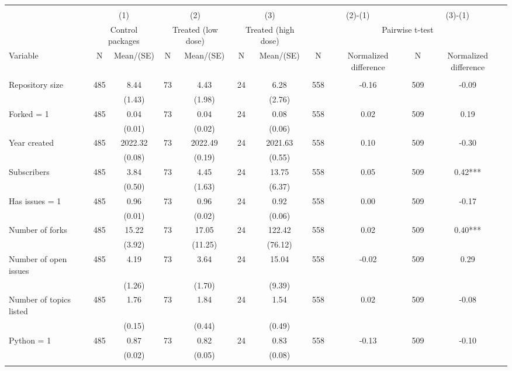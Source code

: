 \begin{tabular}{@{\extracolsep{5pt}}lcccccccccc}
\\[-1.8ex]\hline \hline \\[-1.8ex]
 & \multicolumn{2}{c}{(1)}  & \multicolumn{2}{c}{(2)}  & \multicolumn{2}{c}{(3)}  & \multicolumn{2}{c}{(2)-(1)} & \multicolumn{2}{c}{(3)-(1)} \\
 & \multicolumn{2}{c}{Control packages}  & \multicolumn{2}{c}{Treated (low dose)}  & \multicolumn{2}{c}{Treated (high dose)}  & \multicolumn{4}{c}{Pairwise t-test}  \\
Variable & N & Mean/(SE) & N & Mean/(SE) & N & Mean/(SE) & N & Normalized difference & N & Normalized difference \\ \hline \\[-1.8ex] 
Repository size   & 485    & 8.44    & 73    & 4.43    & 24    & 6.28    & 558    & -0.16    & 509    & -0.09   \\
 &   & (1.43)  &   & (1.98)  &   & (2.76)  &   &  &   &  \\ [1ex]
Forked = 1   & 485    & 0.04    & 73    & 0.04    & 24    & 0.08    & 558    & 0.02    & 509    & 0.19   \\
 &   & (0.01)  &   & (0.02)  &   & (0.06)  &   &  &   &  \\ [1ex]
Year created   & 485    & 2022.32    & 73    & 2022.49    & 24    & 2021.63    & 558    & 0.10    & 509    & -0.30   \\
 &   & (0.08)  &   & (0.19)  &   & (0.55)  &   &  &   &  \\ [1ex]
Subscribers   & 485    & 3.84    & 73    & 4.45    & 24    & 13.75    & 558    & 0.05    & 509    & 0.42***   \\
 &   & (0.50)  &   & (1.63)  &   & (6.37)  &   &  &   &  \\ [1ex]
Has issues = 1   & 485    & 0.96    & 73    & 0.96    & 24    & 0.92    & 558    & 0.00    & 509    & -0.17   \\
 &   & (0.01)  &   & (0.02)  &   & (0.06)  &   &  &   &  \\ [1ex]
Number of forks   & 485    & 15.22    & 73    & 17.05    & 24    & 122.42    & 558    & 0.02    & 509    & 0.40***   \\
 &   & (3.92)  &   & (11.25)  &   & (76.12)  &   &  &   &  \\ [1ex]
Number of open issues   & 485    & 4.19    & 73    & 3.64    & 24    & 15.04    & 558    & -0.02    & 509    & 0.29   \\
 &   & (1.26)  &   & (1.70)  &   & (9.39)  &   &  &   &  \\ [1ex]
Number of topics listed   & 485    & 1.76    & 73    & 1.84    & 24    & 1.54    & 558    & 0.02    & 509    & -0.08   \\
 &   & (0.15)  &   & (0.44)  &   & (0.49)  &   &  &   &  \\ [1ex]
Python = 1   & 485    & 0.87    & 73    & 0.82    & 24    & 0.83    & 558    & -0.13    & 509    & -0.10   \\
 &   & (0.02)  &   & (0.05)  &   & (0.08)  &   &  &   &  \\ [1ex]
\hline \hline \\[-1.8ex]

\end{tabular}
